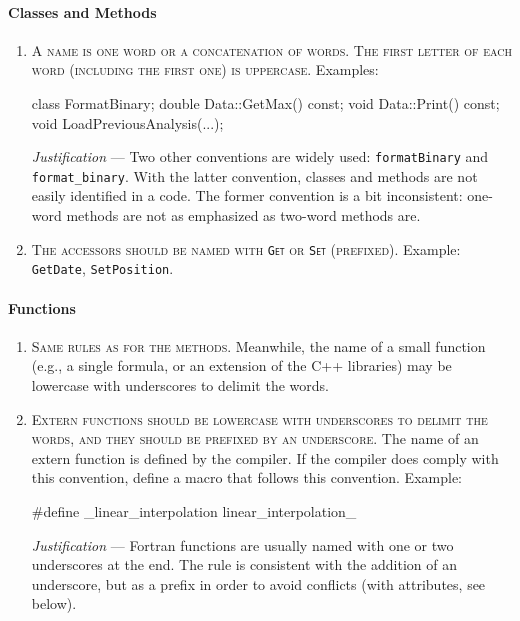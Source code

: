 \documentclass{tufte-book}
\newcounter{points}
\newcommand{\code}[1]{\texttt{#1}}
\renewcommand{\rule}[1]{\textsc{#1}}
\newcommand{\commentcs}[1]{\newline #1}
\newcommand{\njustification}[1]{{\it Justification} --- #1}
\newenvironment{cenumerate}
{
  \begin{enumerate}\setcounter{enumi}{\value{points}}%
  }
  {
    \setcounter{points}{\value{enumi}}\end{enumerate}
}
\begin{document}
\paragraph{Classes and Methods}

\begin{cenumerate}
\item \rule{A name is one word or a concatenation of words. The first letter
    of each word (including the first one) is uppercase.}  \commentcs{Examples:}
\begin{frame_cpp}
class FormatBinary;
double Data::GetMax() const;
void Data::Print() const;
void LoadPreviousAnalysis(...);
\end{frame_cpp}
  \njustification{Two other conventions are widely used: \code{formatBinary}
    and \code{format\_binary}. With the latter convention, classes and methods
    are not easily identified in a code. The former convention is a bit
    inconsistent: one-word methods are not as emphasized as two-word methods
    are.}
\item \rule{The accessors should be named with {\rm \code{Get}} or {\rm
      \code{Set}} (prefixed).} \commentcs{Example: \code{GetDate},
    \code{SetPosition}}.
\end{cenumerate}

\paragraph{Functions}

\begin{cenumerate}
\item \rule{Same rules as for the methods.} \commentcs{Meanwhile, the name of a
    small function (e.g., a single formula, or an extension of the C++
    libraries) may be lowercase with underscores to delimit the words.}
\item \rule{Extern functions should be lowercase with underscores to delimit
    the words, and they should be prefixed by an underscore.}  \commentcs{The
    name of an extern function is defined by the compiler. If the compiler
    does comply with this convention, define a macro that follows this
    convention. Example:}
\begin{frame_cpp}
#define _linear_interpolation linear_interpolation_
\end{frame_cpp}
  \njustification{Fortran functions are usually named with one or two
    underscores at the end. The rule is consistent with the addition of an
    underscore, but as a prefix in order to avoid conflicts (with attributes,
    see below).}
\end{cenumerate}
\end{document}
